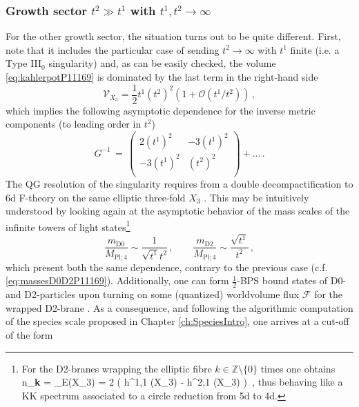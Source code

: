 	
\subsubsection*{Growth sector $t^2\gg t^1$ with $t^1, t^2 \to \infty$}
	
For the other growth sector, the situation turns out to be quite different. First, note that it includes the particular case of sending $t^2 \to \infty$ with $t^1$ finite (i.e. a Type III$_0$ singularity) and, as can be easily checked, the volume \eqref{eq:kahlerpotP11169} is dominated by the last term in the right-hand side
%
\begin{equation}\label{eq:volumen=2limit}
	\mathcal{V}_{X_3} = \frac{1}{2} t^1 (t^2)^2 \left(1 + \mathcal{O}\left(t^1/t^2\right) \right)\, ,
\end{equation}
%
which implies the following asymptotic dependence for the inverse metric components (to leading order in $t^2$)
%
\begin{equation}\label{eq:modspacemetricP11169n=2}
	G^{-1}\, = \, \left(
	\begin{array}{cc}
		2(t^1)^2 & -3 (t^1)^2  \\
		-3 (t^1)^2 & (t^2)^2 \\
	\end{array}
	\right) + \ldots\, .
\end{equation}
%
The QG resolution of the singularity requires from a double decompactification to 6d F-theory on the same elliptic three-fold $X_3$ \cite{Lee:2019wij,Castellano:2022bvr, Marchesano:2022axe}. This may be intuitively understood by looking again at the asymptotic behavior of the mass scales of the infinite towers of light states\footnote{For the D2-branes wrapping the elliptic fibre $k \in \mathbb{Z} \setminus \lbrace 0 \rbrace$ times one obtains \cite{Klemm:2012sx, Klemm:1996hh}
%
\beq \label{eq:GVinvariantsT2limit}
	n_{\textbf{k}} = \chi_E(X_3) = 2 \left ( h^{1,1} (X_3) -  h^{2,1} (X_3) \right)\, ,
\eeq
%
thus behaving like a KK spectrum associated to a circle reduction from 5d to 4d.}
%
\begin{equation}\label{eq:massesD0D2P11169n=2}
	\frac{m_{\text{D0}}}{M_{\text{Pl;}\, 4}}  \sim \frac{1}{\sqrt{t^1} t^2}\, , \qquad \frac{m_{\text{D2}}}{M_{\text{Pl;}\, 4}} \sim \frac{\sqrt{t^1}}{t^2}\, ,
\end{equation}
%
which present both the same dependence, contrary to the previous case (c.f. \eqref{eq:massesD0D2P11169}). Additionally, one can form $\frac{1}{2}$-BPS bound states of D0- and D2-particles upon turning on some (quantized) worldvolume flux $\mathcal{F}$ for the wrapped D2-brane \cite{Polchinski:1998rr}. As a consequence, and following the algorithmic computation of the species scale proposed in Chapter \ref{ch:SpeciesIntro}, one arrives at a cut-off of the form
